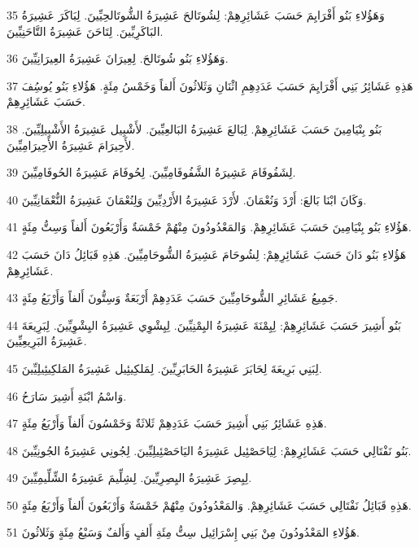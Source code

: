 \par 35 وَهَؤُلاءِ بَنُو أَفْرَايِمَ حَسَبَ عَشَائِرِهِمْ: لِشُوتَالحَ عَشِيرَةُ الشُّوتَالحِيِّينَ. لِبَاكَرَ عَشِيرَةُ البَاكَرِيِّينَ. لِتَاحَنَ عَشِيرَةُ التَّاحَنِيِّينَ.
\par 36 وَهَؤُلاءِ بَنُو شُوتَالحَ. لِعِيرَانَ عَشِيرَةُ العِيرَانِيِّينَ.
\par 37 هَذِهِ عَشَائِرُ بَنِي أَفْرَايِمَ حَسَبَ عَدَدِهِمِ اثْنَانِ وَثَلاثُونَ أَلفاً وَخَمْسُ مِئَةٍ. هَؤُلاءِ بَنُو يُوسُِفَ حَسَبَ عَشَائِرِهِمْ.
\par 38 بَنُو بِنْيَامِينَ حَسَبَ عَشَائِرِهِمْ. لِبَالعَ عَشِيرَةُ البَالعِيِّينَ. لأَشْبِيل عَشِيرَةُ الأَشْبِيلِيِّينَ. لأَحِيرَامَ عَشِيرَةُ الأَحِيرَامِيِّينَ.
\par 39 لِشَفُوفَامَ عَشِيرَةُ الشَّفُوفَامِيِّينَ. لِحُوفَامَ عَشِيرَةُ الحُوفَامِيِّينَ.
\par 40 وَكَانَ ابْنَا بَالعَ: أَرْدَ وَنُعْمَانَ. لأَرْدَ عَشِيرَةُ الأَرْدِيِّينَ وَلِنُعْمَانَ عَشِيرَةُ النُّعْمَانِيِّينَ.
\par 41 هَؤُلاءِ بَنُو بِنْيَامِينَ حَسَبَ عَشَائِرِهِمْ. وَالمَعْدُودُونَ مِنْهُمْ خَمْسَةٌ وَأَرْبَعُونَ أَلفاً وَسِتُّ مِئَةٍ.
\par 42 هَؤُلاءِ بَنُو دَانَ حَسَبَ عَشَائِرِهِمْ: لِشُوحَامَ عَشِيرَةُ الشُّوحَامِيِّينَ. هَذِهِ قَبَائِلُ دَانَ حَسَبَ عَشَائِرِهِمْ.
\par 43 جَمِيعُ عَشَائِرِ الشُّوحَامِيِّينَ حَسَبَ عَدَدِهِمْ أَرْبَعَةٌ وَسِتُّونَ أَلفاً وَأَرْبَعُ مِئَةٍ.
\par 44 بَنُو أَشِيرَ حَسَبَ عَشَائِرِهِمْ: لِيِمْنَةَ عَشِيرَةُ اليِمْنِيِّينَ. لِيِشْوِي عَشِيرَةُ اليِشْوِيِّينَ. لِبَرِيعَةَ عَشِيرَةُ البَرِيعِيِّينَ.
\par 45 لِبَنِي بَرِيعَةَ لِحَابَرَ عَشِيرَةُ الحَابَرِيِّينَ. لِمَلكِيئِيل عَشِيرَةُ المَلكِيئِيلِيِّينَ.
\par 46 وَاسْمُ ابْنَةِ أَشِيرَ سَارَحُ.
\par 47 هَذِهِ عَشَائِرُ بَنِي أَشِيرَ حَسَبَ عَدَدِهِمْ ثَلاثَةٌ وَخَمْسُونَ أَلفاً وَأَرْبَعُ مِئَةٍ.
\par 48 بَنُو نَفْتَالِي حَسَبَ عَشَائِرِهِمْ: لِيَاحَصْئِيل عَشِيرَةُ اليَاحَصْئِيلِيِّينَ. لِجُونِي عَشِيرَةُ الجُونِيِّينَ.
\par 49 لِيِصِرَ عَشِيرَةُ اليِصِرِيِّينَ. لِشِلِّيمَ عَشِيرَةُ الشِّلِّيمِيِّينَ.
\par 50 هَذِهِ قَبَائِلُ نَفْتَالِي حَسَبَ عَشَائِرِهِمْ. وَالمَعْدُودُونَ مِنْهُمْ خَمْسَةٌ وَأَرْبَعُونَ أَلفاً وَأَرْبَعُ مِئَةٍ.
\par 51 هَؤُلاءِ المَعْدُودُونَ مِنْ بَنِي إِسْرَائِيل سِتُّ مِئَةِ أَلفٍ وَأَلفٌ وَسَبْعُ مِئَةٍ وَثَلاثُونَ.
